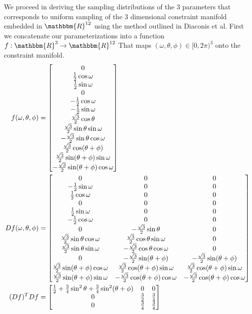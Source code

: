 \documentclass[12pt]{article}
\newcommand*{\Scale}[2][4]{\scalebox{#1}{$#2$}}%
\begin{document}
We proceed in deriving the sampling distributions of the 3 parameters that corresponds to uniform sampling of the 3 dimensional constraint manifold embedded in $\mathbbm{R}^{12}$ using the method outlined in Diaconis et al. First we concatenate our parameterizations into a function $f: \mathbbm{R}^3 \to \mathbbm{R}^{12}$ That maps $(\omega, \theta, \phi) \in [0, 2\pi)^3$ onto the constraint manifold. 
\begin{align}
f(\omega, \theta, \phi) &= \Scale[1.0]{\begin{bmatrix}
0 \\ \frac{1}{2}\cos\omega \\ \frac{1}{2}\sin\omega \\ 0 \\ -\frac{1}{2}\cos\omega \\ -\frac{1}{2}\sin\omega \\
\frac{\sqrt{3}}{2}\cos\theta \\ \frac{\sqrt{3}}{2}\sin\theta\sin\omega \\ -\frac{\sqrt{3}}{2}\sin\theta\cos\omega  \\ 
\frac{\sqrt{3}}{2}\cos(\theta+\phi) \\ \frac{\sqrt{3}}{2}\sin(\theta+\phi)\sin\omega \\ -\frac{\sqrt{3}}{2}\sin(\theta+\phi)\cos\omega
\end{bmatrix}} \\
Df(\omega, \theta, \phi) &= \Scale[1.0]{\begin{bmatrix}
0 & 0 & 0\\ 
-\frac{1}{2}\sin\omega  & 0 & 0 \\ 
\frac{1}{2}\cos\omega  & 0 & 0 \\ 
0  & 0 & 0 \\ 
\frac{1}{2}\sin\omega  & 0 & 0 \\ 
-\frac{1}{2}\cos\omega  & 0 & 0 \\
0 & -\frac{\sqrt{3}}{2}\sin\theta & 0 \\ 
\frac{\sqrt{3}}{2}\sin\theta\cos\omega &\frac{\sqrt{3}}{2}\cos\theta\sin\omega & 0 \\ 
\frac{\sqrt{3}}{2}\sin\theta\sin\omega   & -\frac{\sqrt{3}}{2}\cos\theta\cos\omega & 0 \\ 
0 & -\frac{\sqrt{3}}{2}\sin(\theta+\phi) & -\frac{\sqrt{3}}{2}\sin(\theta+\phi) \\ 
\frac{\sqrt{3}}{2}\sin(\theta+\phi)\cos\omega & \frac{\sqrt{3}}{2}\cos(\theta+\phi)\sin\omega & \frac{\sqrt{3}}{2}\cos(\theta+\phi)\sin\omega   \\ 
\frac{\sqrt{3}}{2}\sin(\theta+\phi)\sin\omega & -\frac{\sqrt{3}}{2}\cos(\theta+\phi)\cos\omega  & -\frac{\sqrt{3}}{2}\cos(\theta+\phi)\cos\omega   
\end{bmatrix}} \\
(Df)^TDf &= \Scale[1.0]{\begin{bmatrix}
\frac{1}{2} + \frac{3}{4}\sin^2\theta + \frac{3}{4}\sin^2(\theta + \phi) & 0 & 0 \\
0 & \frac{3}{2} & \frac{3}{4} \\
0 & \frac{3}{4} & \frac{3}{4} 
\end{bmatrix}}
\end{align}
\end{document}
